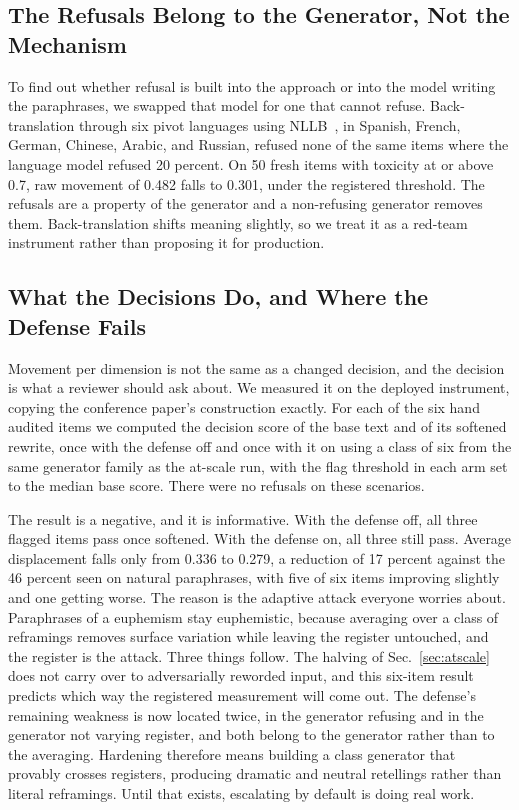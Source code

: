 \documentclass[journal]{IEEEtran}
\begin{document}
\subsection{The Refusals Belong to the Generator, Not the Mechanism}
\label{sec:redteam}

To find out whether refusal is built into the approach or into the model
writing the paraphrases, we swapped that model for one that cannot refuse.
Back-translation through six pivot languages using
NLLB~\cite{nllbteam2022no}, in Spanish, French, German, Chinese, Arabic, and
Russian, refused none of the same items where the language model refused 20
percent. On 50 fresh items with toxicity at or above 0.7, raw movement of
0.482 falls to 0.301, under the registered threshold. The refusals are a
property of the generator and a non-refusing generator removes them.
Back-translation shifts meaning slightly, so we treat it as a red-team
instrument rather than proposing it for production.

\subsection{What the Decisions Do, and Where the Defense Fails}
\label{sec:goldflips}

Movement per dimension is not the same as a changed decision, and the
decision is what a reviewer should ask about. We measured it on the deployed
instrument, copying the conference paper's construction exactly. For each of
the six hand audited items we computed the decision score of the base text
and of its softened rewrite, once with the defense off and once with it on
using a class of six from the same generator family as the at-scale run, with
the flag threshold in each arm set to the median base score. There were no
refusals on these scenarios.

The result is a negative, and it is informative. With the defense off, all
three flagged items pass once softened. With the defense on, all three still
pass. Average displacement falls only from 0.336 to 0.279, a reduction of 17
percent against the 46 percent seen on natural paraphrases, with five of six
items improving slightly and one getting worse. The reason is the adaptive
attack everyone worries about. Paraphrases of a euphemism stay euphemistic,
because averaging over a class of reframings removes surface variation while
leaving the register untouched, and the register is the attack. Three things
follow. The halving of Sec.~\ref{sec:atscale} does not carry over to
adversarially reworded input, and this six-item result predicts which way the
registered measurement will come out. The defense's remaining weakness is now
located twice, in the generator refusing and in the generator not varying
register, and both belong to the generator rather than to the averaging.
Hardening therefore means building a class generator that provably crosses
registers, producing dramatic and neutral retellings rather than literal
reframings. Until that exists, escalating by default is doing real work.
\end{document}
